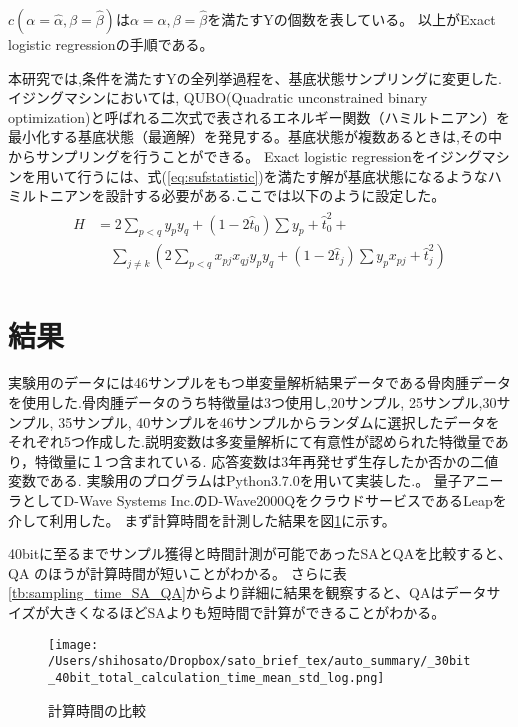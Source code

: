 \documentclass[9pt, twocolumn]{jarticle}
\begin{document}
	$c(\alpha=\hat{\alpha}, \beta=\hat{\beta})$は$\alpha=\hat{\alpha}, \beta= \hat{\beta}$を満たすYの個数を表している。
	以上がExact logistic regressionの手順である。
	
	本研究では,条件を満たすYの全列挙過程を、基底状態サンプリングに変更した.イジングマシンにおいては, QUBO(Quadratic unconstrained binary optimization)と呼ばれる二次式で表されるエネルギー関数（ハミルトニアン）を最小化する基底状態（最適解）を発見する。基底状態が複数あるときは,その中からサンプリングを行うことができる。
	Exact logistic regressionをイジングマシンを用いて行うには、式(\ref{eq:sufstatistic})を満たす解が基底状態になるようなハミルトニアンを設計する必要がある.ここでは以下のように設定した。
	\begin{eqnarray}
		\begin{split}
			H
			&= 2\sum_{p<q}y_py_q + (1-2\hat{t}_0)\sum y_p + \hat{t}_0^2 +\\
			& \quad \sum_{j \neq k}(2 \sum_{p < q}x_{pj} x_{qj} y_p y_q + (1-2 \hat{t}_j) \sum y_p x_{pj} + \hat{t}_j^2)
		\end{split}
	\end{eqnarray}
	
	\section{結果}
	実験用のデータには46サンプルをもつ単変量解析結果データである骨肉腫データを使用した\cite{ostdata}.骨肉腫データのうち特徴量は3つ使用し,20サンプル, 25サンプル,30サンプル, 35サンプル, 40サンプルを46サンプルからランダムに選択したデータをそれぞれ5つ作成した.説明変数は多変量解析にて有意性が認められた特徴量であり，特徴量に１つ含まれている. 応答変数は3年再発せず生存したか否かの二値変数である. 実験用のプログラムはPython3.7.0を用いて実装した.。
	量子アニーラとしてD-Wave Systems Inc.のD-Wave2000QをクラウドサービスであるLeapを介して利用した。
	まず計算時間を計測した結果を図\ref{fig:total_time}に示す。

	40bitに至るまでサンプル獲得と時間計測が可能であったSAとQAを比較すると、QA のほうが計算時間が短いことがわかる。
	さらに表\ref{tb:sampling_time_SA_QA}からより詳細に結果を観察すると、QAはデータサイズが大きくなるほどSAよりも短時間で計算ができることがわかる。

	\begin{figure}
		\begin{center}
			\texttt{[image: /Users/shihosato/Dropbox/sato\_brief\_tex/auto\_summary/\_30bit\_40bit\_total\_calculation\_time\_mean\_std\_log.png]}
		\end{center}
		\caption{計算時間の比較}
		\label{fig:total_time}
	\end{figure}
\end{document}

